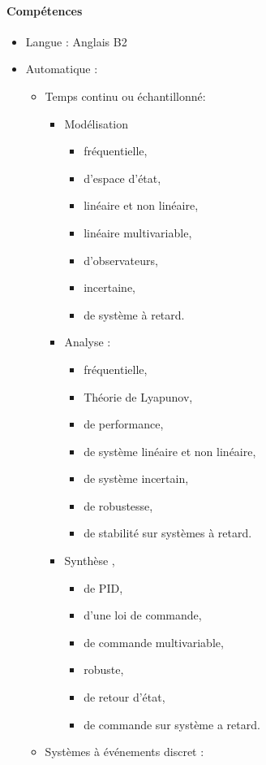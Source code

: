 \documentclass{article}
\begin{document}
\paragraph{Compétences}
\begin{itemize}

\item Langue : Anglais B2

\item Automatique :
	\begin{itemize}
	\item Temps continu ou échantillonné:
		\begin{itemize}
		\item Modélisation 
			\begin{itemize}
			\item fréquentielle,
			\item d'espace d'état, 
			\item linéaire et non linéaire, 
			\item linéaire multivariable, 
			\item d'observateurs, 
			\item incertaine,
			\item de système à retard.
			\end{itemize}		 
		\item Analyse : 
			\begin{itemize}
			\item fréquentielle,
			\item Théorie de Lyapunov,
			\item de performance,
			\item de système linéaire et non linéaire,
			\item de système incertain,
			\item de robustesse, 
			\item de stabilité sur systèmes à retard.
			\end{itemize}
		\item Synthèse , 		
			\begin{itemize}
			\item de PID,
			\item d'une loi de commande,
			\item de commande multivariable,
			\item robuste,
			\item de retour d'état, 
			\item de commande sur système a retard.
			\end{itemize}
		\end{itemize}
	\item Systèmes à événements discret :
		\begin{itemize}
		

\end{itemize}
\end{itemize}
\end{itemize}
\end{document}
